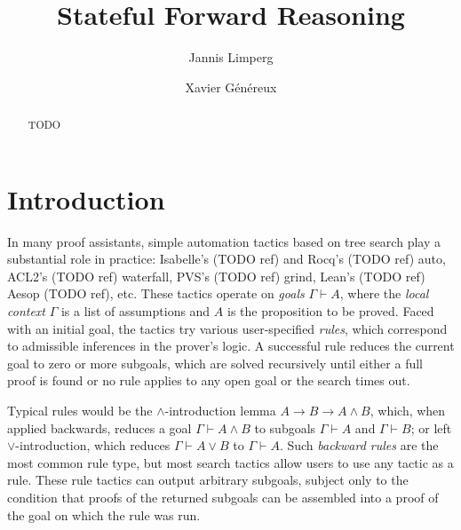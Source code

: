 \documentclass[runningheads]{llncs}
\begin{document}
\title{Stateful Forward Reasoning}


\author{Jannis Limperg \and
  Xavier Généreux}


\maketitle

\begin{abstract}
  TODO

\end{abstract}

\section{Introduction}

In many proof assistants, simple automation tactics based on tree search play a substantial role in practice: Isabelle's (TODO ref) and Rocq's (TODO ref) auto, ACL2's (TODO ref) waterfall, PVS's (TODO ref) grind, Lean's (TODO ref) Aesop (TODO ref), etc.
These tactics operate on \emph{goals} $Γ ⊢ A$, where the \emph{local context} $Γ$ is a list of assumptions and $A$ is the proposition to be proved.
Faced with an initial goal, the tactics try various user-specified \emph{rules}, which correspond to admissible inferences in the prover's logic.
A successful rule reduces the current goal to zero or more subgoals, which are solved recursively until either a full proof is found or no rule applies to any open goal or the search times out.

Typical rules would be the $∧$-introduction lemma $A → B → A ∧ B$, which, when applied backwards, reduces a goal $Γ ⊢ A ∧ B$ to subgoals $Γ ⊢ A$ and $Γ ⊢ B$; or left $∨$-introduction, which reduces $Γ ⊢ A ∨ B$ to $Γ ⊢ A$.
Such \emph{backward rules} are the most common rule type, but most search tactics allow users to use any tactic as a rule.
These rule tactics can output arbitrary subgoals, subject only to the condition that proofs of the returned subgoals can be assembled into a proof of the goal on which the rule was run.
\end{document}
